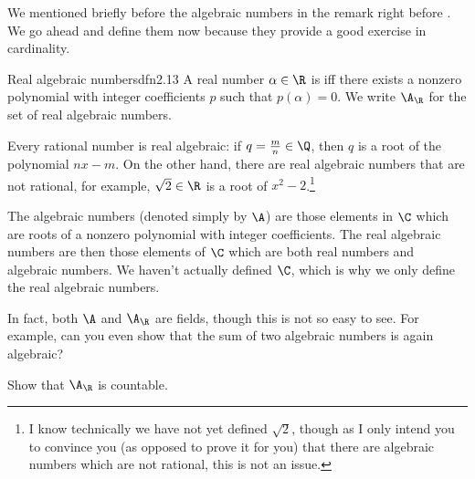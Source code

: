 We mentioned briefly before the algebraic numbers in the remark right before .  We go ahead and define them now because they provide a good exercise in cardinality.
\begin{dfn}{Real algebraic numbers}{dfn2.13}
A real number $\alpha \in \R$ is  iff there exists a nonzero polynomial with integer coefficients $p$ such that $p(\alpha )=0$.  We write $\A _{\R}$\index[notation]{$\A _{\R}$} for the set of real algebraic numbers.
\begin{rmk}
Every rational number is real algebraic:  if $q=\frac{m}{n}\in \Q$, then $q$ is a root of the polynomial $nx-m$.  On the other hand, there are real algebraic numbers that are not rational, for example, $\sqrt{2}\in \R$ is a root of $x^2-2$.\footnote{I know technically we have not yet defined $\sqrt{2}$, though as I only intend you to convince you (as opposed to prove it for you) that there are algebraic numbers which are not rational, this is not an issue.}
\end{rmk}
\begin{rmk}
The algebraic numbers (denoted simply by $\A$\index[notation]{$\A$}) are those elements in $\C$ which are roots of a nonzero polynomial with integer coefficients.  The real algebraic numbers are then those elements of $\C$ which are both real numbers and algebraic numbers.  We haven't actually defined $\C$, which is why we only define the real algebraic numbers.
\end{rmk}
\begin{rmk}
In fact, both $\A$ and $\A _{\R}$ are fields, though this is not so easy to see.  For example, can you even show that the sum of two algebraic numbers is again algebraic?
\end{rmk}
\end{dfn}
\begin{exr}{}{}
Show that $\A _{\R}$ is countable.
\end{exr}

